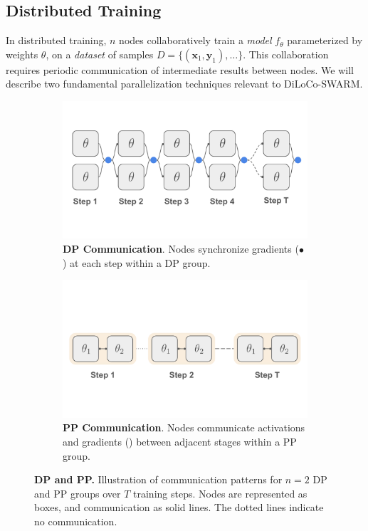 \documentclass{article}
\newcommand{\orangebox}{\colorbox{oorange!50}{\hspace{0.3em}}}
\newcommand{\bluecircle}{\textcolor{bblue}{\LARGE$\bullet$}}
\begin{document}
\subsection{Distributed Training}

In distributed training, $n$ nodes collaboratively train a \textit{model} $f_{\theta}$ parameterized by weights $\theta$, on a \textit{dataset} of samples $D = \{(\mathbf{x}_1, \mathbf{y}_1),\dots\}$. This collaboration requires periodic communication of intermediate results between nodes. We will describe two fundamental parallelization techniques relevant to DiLoCo-SWARM.

\begin{figure}[ht]
    \centering
    \begin{subfigure}[b]{0.48\textwidth}
        \centering
        \vspace{0.5cm}
        \includegraphics[width=\textwidth]{figures/dp.pdf}
        \caption{\textbf{DP Communication}. Nodes synchronize gradients (\bluecircle) at each step within a DP group.}
        \label{fig:dp}
    \end{subfigure}
    \hfill
    \begin{subfigure}[b]{0.45\textwidth}
        \centering
        \vspace{0.5cm}
        \includegraphics[width=\textwidth]{figures/pp.pdf}
        \caption{\textbf{PP Communication}. Nodes communicate activations and gradients (\orangebox) between adjacent stages within a PP group.}
        \label{fig:pp}
    \end{subfigure}
    \caption{\textbf{DP and PP.} Illustration of communication patterns for $n=2$ DP and PP groups over $T$ training steps. Nodes are represented as boxes, and communication as solid lines. The dotted lines indicate no communication.}
\end{figure}
\end{document}
